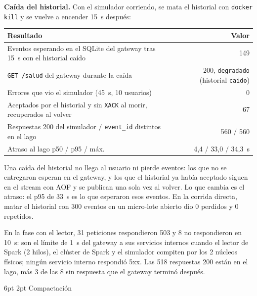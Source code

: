 \documentclass[10pt,letterpaper]{article}
\makeatletter
\renewcommand\subsection{\@startsection{subsection}{2}{\z@}%
  {6pt \@plus 1pt}{2pt}%
  {\normalfont\normalsize\bfseries\color{acc}}}
\makeatother
\begin{document}
\textbf{Caída del historial.} Con el simulador corriendo, se mata el historial con \texttt{docker kill} y se
vuelve a encender 15~s después:

\begin{center}\footnotesize
\begin{tabular}{@{}lr@{}}
\toprule
Resultado & Valor \\
\midrule
Eventos esperando en el SQLite del gateway tras 15~s con el historial caído & 149 \\
\texttt{GET /salud} del gateway durante la caída & 200, \texttt{degradado} (historial \texttt{caido}) \\
Errores que vio el simulador (45~s, 10 usuarios) & 0 \\
Aceptados por el historial y sin \texttt{XACK} al morir, recuperados al volver & 67 \\
Respuestas 200 del simulador / \texttt{event\_id} distintos en el lago & 560 / 560 \\
Atraso al lago p50 / p95 / máx. & 4,4 / 33,0 / 34,3~s \\
\bottomrule
\end{tabular}
\end{center}

Una caída del historial no llega al usuario ni pierde eventos: los que no se entregaron esperan en el
gateway, y los que el historial ya había aceptado siguen en el stream con AOF y se publican una sola vez al
volver. Lo que cambia es el atraso: el p95 de 33~s es lo que esperaron esos eventos. En la corrida directa,
matar el historial con 300 eventos en un micro-lote abierto dio 0 perdidos y 0 repetidos.

En la fase con el lector, 31 peticiones respondieron 503 y 8 no respondieron en 10~s: son el límite de 1~s
del gateway a sus servicios internos cuando el lector de Spark (2 hilos), el clúster de Spark y el simulador
compiten por los 2 núcleos físicos; ningún servicio interno respondió 5xx. Las 518 respuestas 200 están en
el lago, más 3 de las 8 sin respuesta que el gateway terminó después.

\subsection{Compactación}
\end{document}
